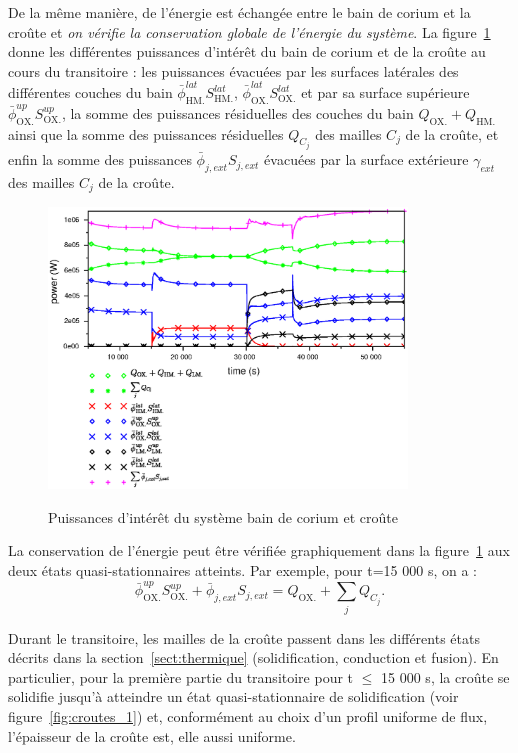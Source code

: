 De la même manière, de l'énergie est échangée entre le bain de corium et la croûte et \emph{on vérifie la conservation globale de l'énergie du système}. La figure~\ref{fig:thermal_balance} donne les différentes puissances d'intérêt du bain de corium et de la croûte au cours du transitoire : les puissances évacuées par les surfaces latérales des différentes couches du bain $\bar{\phi}^{lat}_\textrm{HM.}S^{lat}_\textrm{HM.}$, $\bar{\phi}^{lat}_\textrm{OX.}S^{lat}_\textrm{OX.}$ et par sa surface supérieure $\bar{\phi}^{up}_\textrm{OX.}S^{up}_\textrm{OX.}$, la somme des puissances résiduelles des couches du bain $Q_\textrm{OX.}+Q_\textrm{HM.}$ ainsi que la somme des puissances résiduelles $Q_{C_j}$ des mailles $C_j$ de la croûte, et enfin la somme des puissances $\bar{\phi}_{j,ext}S_{j,ext}$ évacuées par la surface extérieure $\gamma_{ext}$ des mailles $C_j$ de la croûte.
\begin{figure}[H]
\centering
\includegraphics[width=0.85\textwidth, keepaspectratio=true]{Figures/thermal_balance.eps}\\
\caption{Puissances d'intérêt du système bain de corium et croûte}
\label{fig:thermal_balance}
\end{figure}
La conservation de l'énergie peut être vérifiée graphiquement dans la figure~\ref{fig:thermal_balance} aux deux états quasi-stationnaires atteints. Par exemple, pour t=15 000 s, on a :
\begin{equation}
\bar{\phi}^{up}_\textrm{OX.}S^{up}_\textrm{OX.} + \bar{\phi}_{j,ext}S_{j,ext} = Q_\textrm{OX.} + \sum_j Q_{C_j}.
\end{equation}

Durant le transitoire, les mailles de la croûte passent dans les différents états décrits dans la section~\ref{sect:thermique} (solidification, conduction et fusion). En particulier, pour la première partie du transitoire pour t $\leq$ 15 000 s, la croûte se solidifie jusqu'à atteindre un état quasi-stationnaire de solidification (voir figure~\ref{fig:croutes_1}) et, conformément au choix d'un profil uniforme de flux, l'épaisseur de la croûte est, elle aussi uniforme.

